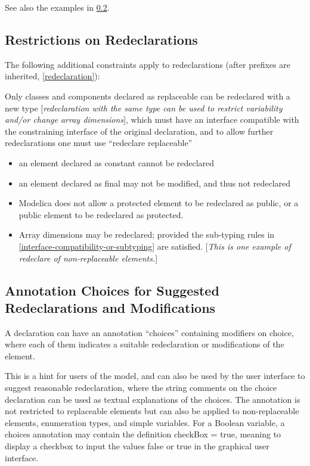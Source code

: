 \documentclass[10pt,a4paper]{report}
\def\doublelabel#1{\label{#1}}
\begin{document}
See also the examples in \ref{annotation-choices-for-suggested-redeclarations-and-modifications}.

\subsection{Restrictions on Redeclarations}\doublelabel{restrictions-on-redeclarations}

The following additional constraints apply to redeclarations (after
prefixes are inherited, \ref{redeclaration}):

Only classes and components declared as replaceable can be redeclared
with a new type {[}\emph{redeclaration with the same type can be used to
restrict variability and/or change array dimensions}{]}, which must have
an interface compatible with the constraining interface of the original
declaration, and to allow further redeclarations one must use
``redeclare replaceable''

\begin{itemize}
\item
  an element declared as constant cannot be redeclared
\item
  an element declared as final may not be modified, and thus not
  redeclared
\item
  Modelica does not allow a protected element to be redeclared as
  public, or a public element to be redeclared as protected.
\item
  Array dimensions may be redeclared; provided the sub-typing rules in
  \ref{interface-compatibility-or-subtyping} are satisfied. {[}\emph{This is one example of redeclare of
  non-replaceable elements.}{]}
\end{itemize}

\subsection{Annotation Choices for Suggested Redeclarations and Modifications}\doublelabel{annotation-choices-for-suggested-redeclarations-and-modifications}

A declaration can have an annotation ``choices'' containing modifiers on
choice, where each of them indicates a suitable redeclaration or
modifications of the element.

This is a hint for users of the model, and can also be used by the user
interface to suggest reasonable redeclaration, where the string comments
on the choice declaration can be used as textual explanations of the
choices. The annotation is not restricted to replaceable elements but
can also be applied to non-replaceable elements, enumeration types, and
simple variables. For a Boolean variable, a choices annotation may
contain the definition checkBox = true, meaning to display a checkbox to
input the values false or true in the graphical user interface.
\end{document}
